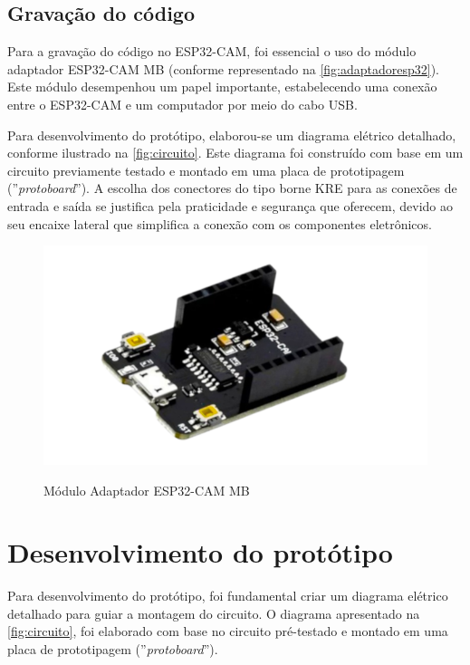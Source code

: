 \subsection{Gravação do código}\label{sec:gravador}

Para a gravação do código no ESP32-CAM, foi essencial o uso do módulo 
adaptador ESP32-CAM MB (conforme representado na 
\autoref{fig:adaptadoresp32}). Este módulo desempenhou um papel importante, 
estabelecendo uma conexão entre o ESP32-CAM e um computador por meio 
do cabo USB.

Para desenvolvimento do protótipo, elaborou-se um diagrama elétrico 
detalhado, conforme ilustrado na \autoref{fig:circuito}. Este diagrama 
foi construído com base em um circuito previamente testado e montado em 
uma placa de prototipagem (''\textit{protoboard}''). A escolha dos conectores do 
tipo borne KRE para as conexões de entrada e saída se justifica pela 
praticidade e segurança que oferecem, devido ao seu encaixe lateral que 
simplifica a conexão com os componentes eletrônicos.

\begin{figure}[h!]
    \centering
    \caption{Módulo Adaptador ESP32-CAM MB}
    \includegraphics[scale=0.25]{figuras/adaptador_esp32cam.png}
    \label{fig:adaptadoresp32}
    \centering
\end{figure}

\section{Desenvolvimento do protótipo}\label{sec:prototipo}

Para desenvolvimento do protótipo, foi fundamental criar um diagrama 
elétrico detalhado para guiar a montagem do circuito. O diagrama 
apresentado na \autoref{fig:circuito}, foi elaborado com base no 
circuito pré-testado e montado em uma placa de prototipagem (''\textit{protoboard}'').

